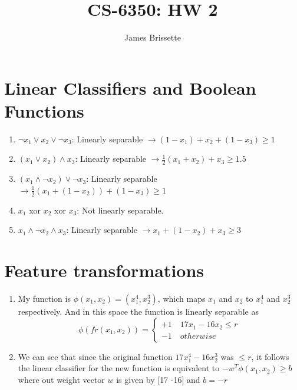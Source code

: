 \documentclass[11pt,a4paper]{article}
\author{James Brissette}
\title{CS-6350: HW 2}
\begin{document}
	\maketitle
	
	\section{Linear Classifiers and Boolean Functions}
		\begin{enumerate}
			\item $\neg x_1 \vee x_2 \vee \neg x_3 $: Linearly separable $\rightarrow (1-x_1)+x_2 + (1-x_3) \geq 1$
			\item $(x_1 \vee x_2) \wedge x_3$: Linearly separable $\rightarrow \frac{1}{2}(x_1 + x_2) + x_3 \geq 1.5$
			\item $(x_1 \wedge \neg x_2) \vee \neg x_3$: Linearly separable $\rightarrow \frac{1}{2}(x_1 + (1-x_2))+(1-x_3) \geq 1$
			\item $x_1$ xor $x_2$ xor $x_3$: Not linearly separable.
			\item $x_1 \wedge \neg x_2 \wedge x_3$: Linearly separable $\rightarrow x_1 + (1-x_2) + x_3 \geq 3$
		\end{enumerate}
	
	\section{Feature transformations}
		\begin{enumerate}
			\item My function is $\phi ( x_{1} , x_{2} ) = ( x_{1}^{4} , x_{2}^{3} )$, which maps $x_{1}$ and $x_{2}$ to $x_{1}^{4}$ and $x_{2}^{3}$ respectively. And in this space the function is linearly separable as $$\phi(fr(x_1,x_2)) = \begin{cases}
			+1 \quad 17x_1-16x_2 \leq r \\
			-1 \quad otherwise
			\end{cases}$$
			\item We can see that since the original function $17x_1^4-16x_2^3$ was $\leq r$, it follows the linear classifier for the new function is equivalent to $-w^T\phi (x_1,x_2) \geq b$ where out weight vector $w$ is given by [17 -16] and $b=-r$
		\end{enumerate}
	
\end{document}
